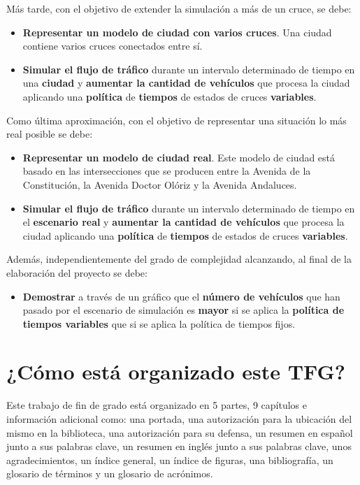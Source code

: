 Más tarde, con el objetivo de extender la simulación a más de un cruce, se debe:
\begin{itemize}
    \item \textbf{Representar un modelo de ciudad con varios cruces}. Una ciudad contiene varios cruces conectados entre sí.
    \item \textbf{Simular el flujo de tráfico} durante un intervalo determinado de tiempo en una \textbf{ciudad} y \textbf{aumentar la cantidad de vehículos} que procesa la ciudad aplicando una \textbf{política} de \textbf{tiempos} de estados de cruces \textbf{variables}.
\end{itemize}

Como última aproximación, con el objetivo de representar una situación lo más real posible se debe:
\begin{itemize}
    \item \textbf{Representar un modelo de ciudad real}. Este modelo de ciudad está basado en las intersecciones que se producen entre la Avenida de la Constitución, la Avenida Doctor Olóriz y la Avenida Andaluces.
    \item \textbf{Simular el flujo de tráfico} durante un intervalo determinado de tiempo en el \textbf{escenario real} y \textbf{aumentar la cantidad de vehículos} que procesa la ciudad aplicando una \textbf{política} de \textbf{tiempos} de estados de cruces \textbf{variables}.
\end{itemize}

Además, independientemente del grado de complejidad alcanzando, al final de la elaboración del proyecto se debe:
\begin{itemize}
    \item \textbf{Demostrar} a través de un gráfico que el \textbf{número de vehículos} que han pasado por el escenario de simulación es \textbf{mayor} si se aplica la \textbf{política de tiempos variables} que si se aplica la política de tiempos fijos.
\end{itemize}

\newpage
\section{¿Cómo está organizado este TFG?}
Este trabajo de fin de grado está organizado en 5 partes, 9 capítulos e información adicional como: una portada, una autorización para la ubicación del mismo en la biblioteca, una autorización para su defensa, un resumen en español junto a sus palabras clave, un resumen en inglés junto a sus palabras clave, unos agradecimientos, un índice general, un índice de figuras, una bibliografía, un glosario de términos y un glosario de acrónimos.

